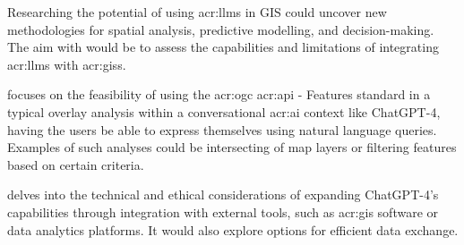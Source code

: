 Researching the potential of using \glspl{acr:llm} in GIS could uncover new methodologies for spatial analysis, predictive modelling, and decision-making. The aim with  would be to assess the capabilities and limitations of integrating \glspl{acr:llm} with \glspl{acr:gis}.

 focuses on the feasibility of using the \acrshort{acr:ogc} \acrshort{acr:api} - Features standard in a typical overlay analysis within a conversational \acrshort{acr:ai} context like ChatGPT-4, having the users be able to express themselves using natural language queries. Examples of such analyses could be intersecting of map layers or filtering features based on certain criteria.

 delves into the technical and ethical considerations of expanding ChatGPT-4's capabilities through integration with external tools, such as \acrshort{acr:gis} software or data analytics platforms. It would also explore options for efficient data exchange.

